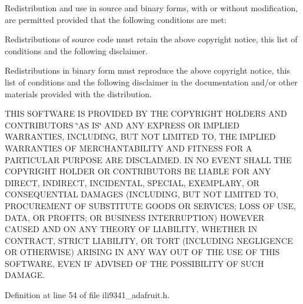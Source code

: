 Redistribution and use in source and binary forms, with or without modification, are permitted provided that the following conditions are met\-:


\begin{DoxyItemize}
\item Redistributions of source code must retain the above copyright notice, this list of conditions and the following disclaimer.
\item Redistributions in binary form must reproduce the above copyright notice, this list of conditions and the following disclaimer in the documentation and/or other materials provided with the distribution.
\end{DoxyItemize}

T\-H\-I\-S S\-O\-F\-T\-W\-A\-R\-E I\-S P\-R\-O\-V\-I\-D\-E\-D B\-Y T\-H\-E C\-O\-P\-Y\-R\-I\-G\-H\-T H\-O\-L\-D\-E\-R\-S A\-N\-D C\-O\-N\-T\-R\-I\-B\-U\-T\-O\-R\-S \char`\"{}\-A\-S I\-S\char`\"{} A\-N\-D A\-N\-Y E\-X\-P\-R\-E\-S\-S O\-R I\-M\-P\-L\-I\-E\-D W\-A\-R\-R\-A\-N\-T\-I\-E\-S, I\-N\-C\-L\-U\-D\-I\-N\-G, B\-U\-T N\-O\-T L\-I\-M\-I\-T\-E\-D T\-O, T\-H\-E I\-M\-P\-L\-I\-E\-D W\-A\-R\-R\-A\-N\-T\-I\-E\-S O\-F M\-E\-R\-C\-H\-A\-N\-T\-A\-B\-I\-L\-I\-T\-Y A\-N\-D F\-I\-T\-N\-E\-S\-S F\-O\-R A P\-A\-R\-T\-I\-C\-U\-L\-A\-R P\-U\-R\-P\-O\-S\-E A\-R\-E D\-I\-S\-C\-L\-A\-I\-M\-E\-D. I\-N N\-O E\-V\-E\-N\-T S\-H\-A\-L\-L T\-H\-E C\-O\-P\-Y\-R\-I\-G\-H\-T H\-O\-L\-D\-E\-R O\-R C\-O\-N\-T\-R\-I\-B\-U\-T\-O\-R\-S B\-E L\-I\-A\-B\-L\-E F\-O\-R A\-N\-Y D\-I\-R\-E\-C\-T, I\-N\-D\-I\-R\-E\-C\-T, I\-N\-C\-I\-D\-E\-N\-T\-A\-L, S\-P\-E\-C\-I\-A\-L, E\-X\-E\-M\-P\-L\-A\-R\-Y, O\-R C\-O\-N\-S\-E\-Q\-U\-E\-N\-T\-I\-A\-L D\-A\-M\-A\-G\-E\-S (I\-N\-C\-L\-U\-D\-I\-N\-G, B\-U\-T N\-O\-T L\-I\-M\-I\-T\-E\-D T\-O, P\-R\-O\-C\-U\-R\-E\-M\-E\-N\-T O\-F S\-U\-B\-S\-T\-I\-T\-U\-T\-E G\-O\-O\-D\-S O\-R S\-E\-R\-V\-I\-C\-E\-S; L\-O\-S\-S O\-F U\-S\-E, D\-A\-T\-A, O\-R P\-R\-O\-F\-I\-T\-S; O\-R B\-U\-S\-I\-N\-E\-S\-S I\-N\-T\-E\-R\-R\-U\-P\-T\-I\-O\-N) H\-O\-W\-E\-V\-E\-R C\-A\-U\-S\-E\-D A\-N\-D O\-N A\-N\-Y T\-H\-E\-O\-R\-Y O\-F L\-I\-A\-B\-I\-L\-I\-T\-Y, W\-H\-E\-T\-H\-E\-R I\-N C\-O\-N\-T\-R\-A\-C\-T, S\-T\-R\-I\-C\-T L\-I\-A\-B\-I\-L\-I\-T\-Y, O\-R T\-O\-R\-T (I\-N\-C\-L\-U\-D\-I\-N\-G N\-E\-G\-L\-I\-G\-E\-N\-C\-E O\-R O\-T\-H\-E\-R\-W\-I\-S\-E) A\-R\-I\-S\-I\-N\-G I\-N A\-N\-Y W\-A\-Y O\-U\-T O\-F T\-H\-E U\-S\-E O\-F T\-H\-I\-S S\-O\-F\-T\-W\-A\-R\-E, E\-V\-E\-N I\-F A\-D\-V\-I\-S\-E\-D O\-F T\-H\-E P\-O\-S\-S\-I\-B\-I\-L\-I\-T\-Y O\-F S\-U\-C\-H D\-A\-M\-A\-G\-E. 

Definition at line 54 of file ili9341\-\_\-adafruit.\-h.



